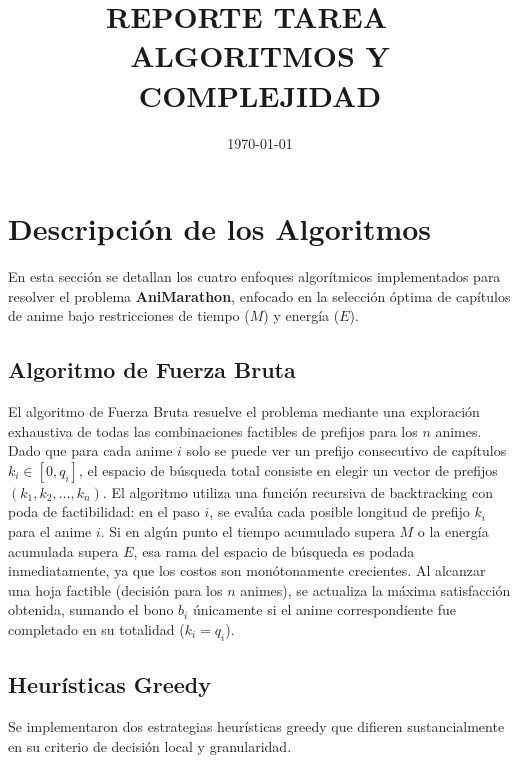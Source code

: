 \documentclass[11pt,spanish]{article} %
\author{\namestudent}
\title{
  \huge
  \textbf{REPORTE TAREA \tnum~ \\ ALGORITMOS Y COMPLEJIDAD} \\[1ex]
  \emph{\textquote{¿Quién ganará? Greedys vs Dinámico vs Bruto.}}
  }
\date{
  \small
  \today\\
  \currenttime
}
\begin{document}
\maketitle
\thispagestyle{fancy}
\vspace{-1.0\baselineskip}

\section{Descripción de los Algoritmos}

En esta sección se detallan los cuatro enfoques algorítmicos implementados para resolver el problema \textbf{AniMarathon}, enfocado en la selección óptima de capítulos de anime bajo restricciones de tiempo ($M$) y energía ($E$).

\subsection{Algoritmo de Fuerza Bruta}
El algoritmo de Fuerza Bruta resuelve el problema mediante una exploración exhaustiva de todas las combinaciones factibles de prefijos para los $n$ animes. Dado que para cada anime $i$ solo se puede ver un prefijo consecutivo de capítulos $k_i \in [0, q_i]$, el espacio de búsqueda total consiste en elegir un vector de prefijos $(k_1, k_2, \dots, k_n)$. El algoritmo utiliza una función recursiva de backtracking con poda de factibilidad: en el paso $i$, se evalúa cada posible longitud de prefijo $k_i$ para el anime $i$. Si en algún punto el tiempo acumulado supera $M$ o la energía acumulada supera $E$, esa rama del espacio de búsqueda es podada inmediatamente, ya que los costos son monótonamente crecientes. Al alcanzar una hoja factible (decisión para los $n$ animes), se actualiza la máxima satisfacción obtenida, sumando el bono $b_i$ únicamente si el anime correspondiente fue completado en su totalidad ($k_i = q_i$).

\subsection{Heurísticas Greedy}
Se implementaron dos estrategias heurísticas greedy que difieren sustancialmente en su criterio de decisión local y granularidad.
\end{document}
